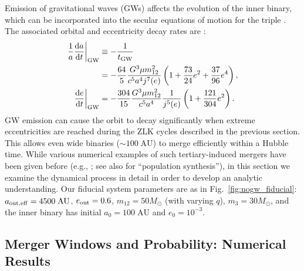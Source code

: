 \documentclass[
        fleqn,
        usenatbib,
    ]{mnras}
\newcommand*{\rd}[2]{\frac{\mathrm{d}#1}{\mathrm{d}#2}}
\newcommand*{\at}[1]{\left.#1\right|}
\newcommand*{\p}[1]{\left(#1\right)}
\begin{document}
Emission of gravitational waves (GWs) affects the evolution of the inner
binary, which can be incorporated into the secular equations of motion for the
triple \citep[e.g.,]{peters1964, LL18}. The associated orbital and eccentricity
decay rates are \citep{peters1964}:
\begin{align}
    \at{\frac{1}{a}\rd{a}{t}}_{\rm GW} &\equiv -\frac{1}{t_{\rm GW}}\nonumber\\
        &= -\frac{64}{5}\frac{G^3 \mu m_{12}^2}{c^5a^4j^7(e)}
            \p{1 + \frac{73}{24}e^2 + \frac{37}{96}e^4}\label{eq:def_tgw},\\
    \at{\rd{e}{t}}_{\rm GW} &= -\frac{304}{15}\frac{G^3 \mu m_{12}^2}{c^5a^4}
        \frac{1}{j^{5}(e)}\p{1 + \frac{121}{304}e^2}\label{eq:dedt_gw}.
\end{align}
GW emission can cause the orbit to decay significantly when extreme
eccentricities are reached during the ZLK cycles described in the previous
section. This allows even wide binaries ($\sim 100\;\mathrm{AU}$) to merge
efficiently within a Hubble time. While various numerical examples of such
tertiary-induced mergers have been given before (e.g., \citet{LL18}; see also
\citet{LL19} for ``population synthesis''), in this section we examine the
dynamical process in detail in order to develop an analytic understanding.
Our fiducial system parameters are as in Fig.~\ref{fig:nogw_fiducial}:
$a_{\rm out, eff} = 4500\;\mathrm{AU}$, $e_{\rm out} =
0.6$, $m_{12} = 50M_{\odot}$ (with varying $q$), $m_3 = 30M_{\odot}$, and the
inner binary has initial $a_0 = 100\;\mathrm{AU}$ and $e_0 = 10^{-3}$.

\subsection{Merger Windows and Probability: Numerical Results}\label{ss:windows}
\end{document}
